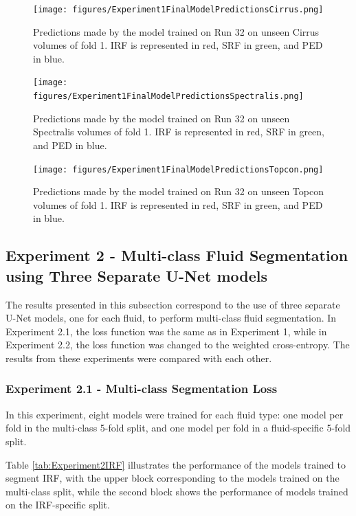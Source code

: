 \begin{figure}[!ht]
	\centering
	\texttt{[image: figures/Experiment1FinalModelPredictionsCirrus.png]}
	\caption{Predictions made by the model trained on Run 32 on unseen Cirrus volumes of fold 1. IRF is represented in red, SRF in green, and PED in blue.}
	\label{fig:Experiment1FinalModelPredictionsCirrus}
\end{figure}

\begin{figure}[!ht]
	\centering
	\texttt{[image: figures/Experiment1FinalModelPredictionsSpectralis.png]}
	\caption{Predictions made by the model trained on Run 32 on unseen Spectralis volumes of fold 1. IRF is represented in red, SRF in green, and PED in blue.}
	\label{fig:Experiment1FinalModelPredictionsSpectralis}
\end{figure}

\begin{figure}[!ht]
	\centering
	\texttt{[image: figures/Experiment1FinalModelPredictionsTopcon.png]}
	\caption{Predictions made by the model trained on Run 32 on unseen Topcon volumes of fold 1. IRF is represented in red, SRF in green, and PED in blue.}
	\label{fig:Experiment1FinalModelPredictionsTopcon}
\end{figure}

\subsection{Experiment 2 - Multi-class Fluid Segmentation using Three Separate U-Net models}
The results presented in this subsection correspond to the use of three separate U-Net models, one for each fluid, to perform multi-class fluid segmentation. In Experiment 2.1, the loss function was the same as in Experiment 1, while in Experiment 2.2, the loss function was changed to the weighted cross-entropy. The results from these experiments were compared with each other.

\subsubsection{Experiment 2.1 - Multi-class Segmentation Loss}
In this experiment, eight models were trained for each fluid type: one model per fold in the multi-class 5-fold split, and one model per fold in a fluid-specific 5-fold split.
\par
Table \ref{tab:Experiment2IRF} illustrates the performance of the models trained to segment IRF, with the upper block corresponding to the models trained on the multi-class split, while the second block shows the performance of models trained on the IRF-specific split.

